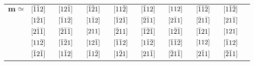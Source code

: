\documentclass[%
 reprint,
superscriptaddress,
 amsmath,amssymb,
prb,
]{revtex4-1}
\begin{document}
\begin{table}[h!]
\begin{ruledtabular}
\begin{tabular}{c c c c c c c c c c c c c c c c c}
$\mathbf{m} \simeq$ & $\hspace{-5pt}[\bar{1}\bar{1}2]$  & & $\hspace{-5pt}[12\bar{1}]$&  &$\hspace{-5pt}[\bar{1}\bar{2}1]$ & & $\hspace{-5pt}[11\bar{2}]$ & & $\hspace{-5pt}[\bar{1}12]$ & & $\hspace{-5pt}[112]$ & & $\hspace{-5pt}[\bar{1}\bar{1}\bar{2}]$ & & $\hspace{-5pt}[1\bar{1}\bar{2}]$ \\
 & $\hspace{-5pt}[1\bar{2}1]$ & & $\hspace{-5pt}[\bar{1}1\bar{2}]$ & & $\hspace{-5pt}[1\bar{1}2]$ & & $\hspace{-5pt}[\bar{1}2\bar{1}]$ & & $\hspace{-5pt}[\bar{2}\bar{1}1]$ & & $\hspace{-5pt}[2\bar{1}1]$& & $\hspace{-5pt}[\bar{2}1\bar{1}]$ & & $\hspace{-5pt}[21\bar{1}]$\\
 & $\hspace{-5pt}[2\bar{1}\bar{1}]$ & & $\hspace{-5pt}[\bar{2}\bar{1}\bar{1}]$ &  & $\hspace{-5pt}[211]$ & & $\hspace{-5pt}[\bar{2}11]$ & & $\hspace{-5pt}[\bar{1}\bar{2}\bar{1}]$& & $\hspace{-5pt}[1\bar{2}\bar{1}]$ & & $\hspace{-5pt}[\bar{1}21]$ & & $\hspace{-5pt}[121]$\\
 & $\hspace{-5pt}[11\bar{2}]$ & & $\hspace{-5pt}[\bar{1}\bar{2}1]$ &  & $\hspace{-5pt}[12\bar{1}]$ & & $\hspace{-5pt}[\bar{1}\bar{1}2]$ & & $\hspace{-5pt}[1\bar{1}\bar{2}]$ & & $\hspace{-5pt}[\bar{1}\bar{1}\bar{2}]$ & & $\hspace{-5pt}[112]$ & & $\hspace{-5pt}[\bar{1}12]$\\
 & $\hspace{-5pt}[\bar{1}2\bar{1}]$ & & $\hspace{-5pt}[1\bar{1}2]$ & & $\hspace{-5pt}[\bar{1}1\bar{2}]$ & & $\hspace{-5pt}[1\bar{2}1]$ & & $\hspace{-5pt}[21\bar{1}]$ & & $\hspace{-5pt}[\bar{2}1\bar{1}]$ & & $\hspace{-5pt}[2\bar{1}1]$ & & $\hspace{-5pt}[\bar{2}\bar{1}1]$\\

\end{tabular}
\end{ruledtabular}
\end{table}
\end{document}
